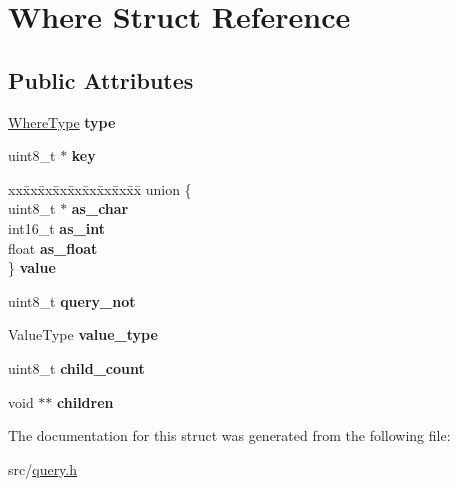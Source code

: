 \hypertarget{struct_where}{}\section{Where Struct Reference}
\label{struct_where}
\subsection*{Public Attributes}
\begin{DoxyCompactItemize}
\item 
\hypertarget{struct_where_aaed6b2878aee96fe201fb2f742263ffc}{}\hyperlink{query_8h_a5f007a3fe5613ea1d283e0f5b9b1fdf6}{Where\+Type} {\bfseries type}\label{struct_where_aaed6b2878aee96fe201fb2f742263ffc}

\item 
\hypertarget{struct_where_af822cf3ae78213cd8a8a3104646fdddc}{}uint8\+\_\+t $\ast$ {\bfseries key}\label{struct_where_af822cf3ae78213cd8a8a3104646fdddc}

\item 
\hypertarget{struct_where_af5ce2bd80b4fca398cc1c1d776cebdf3}{}\begin{tabbing}
xx\=xx\=xx\=xx\=xx\=xx\=xx\=xx\=xx\=\kill
union \{\\
\>uint8\_t $\ast$ {\bfseries as\_char}\\
\>int16\_t {\bfseries as\_int}\\
\>float {\bfseries as\_float}\\
\} {\bfseries value}\label{struct_where_af5ce2bd80b4fca398cc1c1d776cebdf3}
\\

\end{tabbing}\item 
\hypertarget{struct_where_a13756392512c4ffe9cd932ab91174a1b}{}uint8\+\_\+t {\bfseries query\+\_\+not}\label{struct_where_a13756392512c4ffe9cd932ab91174a1b}

\item 
\hypertarget{struct_where_a10bb3d6cdf41f7844b6f93a7f794e48a}{}Value\+Type {\bfseries value\+\_\+type}\label{struct_where_a10bb3d6cdf41f7844b6f93a7f794e48a}

\item 
\hypertarget{struct_where_a88dfe29fc91a30cc3d91ff06c7317e22}{}uint8\+\_\+t {\bfseries child\+\_\+count}\label{struct_where_a88dfe29fc91a30cc3d91ff06c7317e22}

\item 
\hypertarget{struct_where_a703bc718d62931c8bf2edf1bc6924c61}{}void $\ast$$\ast$ {\bfseries children}\label{struct_where_a703bc718d62931c8bf2edf1bc6924c61}

\end{DoxyCompactItemize}


The documentation for this struct was generated from the following file\+:\begin{DoxyCompactItemize}
\item 
src/\hyperlink{query_8h}{query.\+h}\end{DoxyCompactItemize}
